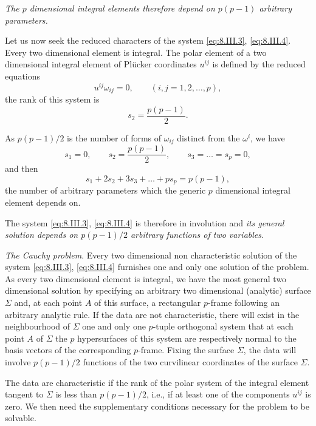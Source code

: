 \documentclass[leqno,11pt]{book}
\numberwithin{equation}{chapter}
\theoremstyle{shape1}
\theoremstyle{shape0}
\theoremstyle{shape2}
\theoremstyle{definition}
\begin{document}
\emph{The $p$ dimensional integral elements therefore depend on $p(p-1)$ arbitrary parameters.}

Let us now seek the reduced characters of the system \eqref{eq:8.III.3}, \eqref{eq:8.III.4}. Every two dimensional element is integral. The polar element of a two dimensional integral element of Pl\"ucker coordinates $u^{ij}$ is defined by the reduced equations
\[
u^{ij}\omega_{ij}=0,\qquad(i,j=1,2,\dots,p),
\]
the rank of this system is
\[
s_{2}=\frac{p(p-1)}{2}.
\]

As $p(p-1)/2$ is the number of forms of $\omega_{ij}$ distinct from the $\omega^{i}$, we have
\[
s_{1}=0,\qquad s_{2}=\frac{p(p-1)}{2},\qquad s_{3}=\dots=s_{p}=0,
\]
and then
\[
s_{1}+2s_{2}+3s_{3}+\dots+ps_{p}=p(p-1),
\]
the number of arbitrary parameters which the generic $p$ dimensional integral element depends on.

The system \eqref{eq:8.III.3}, \eqref{eq:8.III.4} is therefore in involution and \emph{its general solution depends on $p(p-1)/2$ arbitrary functions of two variables.}

\vspace{12pt}\fsec\emph{The Cauchy problem}. Every two dimensional non characteristic solution of the system \eqref{eq:8.III.3}, \eqref{eq:8.III.4} furnishes one and only one solution of the problem. As every two dimensional element is integral, we have the most general two dimensional solution by specifying an arbitrary two dimensional (analytic) surface $\Sigma$ and, at each point $A$ of this surface, a rectangular $p$-frame following an arbitrary analytic rule. If the data are not characteristic, there will exist in the neighbourhood of $\Sigma$ one and only one $p$-tuple orthogonal system that at each point $A$ of $\Sigma$ the $p$ hypersurfaces of this system are respectively normal to the basis vectors of the corresponding $p$-frame. Fixing the surface $\Sigma$, the data will involve $p(p-1)/2$ functions of the two curvilinear coordinates of the surface $\Sigma$.

The data are characteristic if the rank of the polar system of the integral element tangent to $\Sigma$ is less than $p(p-1)/2$, i.e., if at least one of the components $u^{ij}$ is zero. We then need the supplementary conditions necessary for the problem to be solvable.
\end{document}

